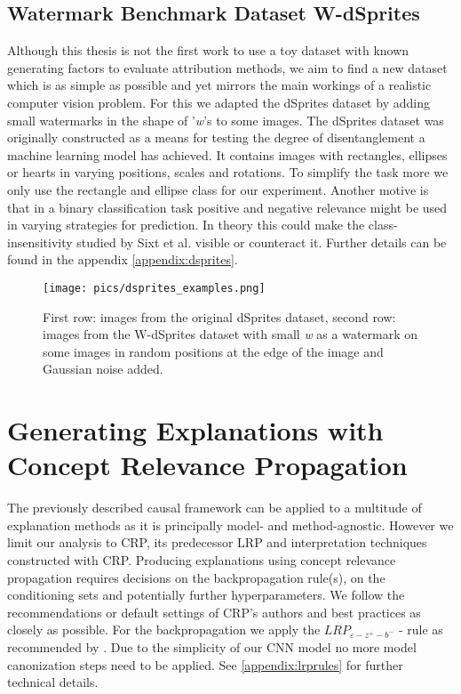 \subsection{Watermark Benchmark Dataset W-dSprites}\label{section:causal_model}
Although this thesis is not the first work to use a toy dataset with known generating factors to evaluate attribution methods, we aim to find a new dataset which is as simple as possible and yet mirrors the main workings of a realistic computer vision problem. For this we adapted the dSprites dataset \cite{dsprites17} by adding small watermarks in the shape of '\textit{w}'s to some images. The dSprites dataset was originally constructed as a means for testing the degree of disentanglement a machine learning model has achieved. It contains images with rectangles, ellipses or hearts in varying positions, scales and rotations. To simplify the task more we only use the rectangle and ellipse class for our experiment. Another motive is that in a binary classification task positive and negative relevance might be used in varying strategies for prediction. In theory this could make the class-insensitivity studied by Sixt et al. \cite{Sixt2020} visible or counteract it. Further details can be found in the appendix \cref{appendix:dsprites}.

\begin{figure}[H]
    \centering
    \texttt{[image: pics/dsprites\_examples.png]}
    \caption{First row: images from the original dSprites dataset, second row: images from the W-dSprites dataset with small \textit{w} as a watermark on some images in random positions at the edge of the image and Gaussian noise added.}
    \label{fig:dsprites_examples}
\end{figure}

\section{Generating Explanations with Concept Relevance Propagation}
The previously described causal framework can be applied to a multitude of explanation methods as it is principally model- and method-agnostic. However we limit our analysis to CRP, its predecessor LRP and interpretation techniques constructed with CRP.
Producing explanations using concept relevance propagation requires decisions on the backpropagation rule(s), on the conditioning sets and potentially further hyperparameters. 
We follow the recommendations or default settings of CRP's authors \cite{Achtibat2022, Achtibat2023} and best practices \cite{Kohlbrenner2020} as closely as possible.
For the backpropagation we apply the $LRP_{\varepsilon -z^+- b^-}$ - rule as recommended by \cite{Kohlbrenner2020}. Due to the simplicity of our CNN model no more model canonization steps need to be applied. See \cref{appendix:lrprules} for further technical details. 

